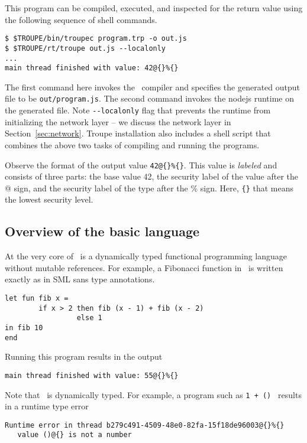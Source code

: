 This program can be compiled, executed, and inspected for the return value using the following sequence of shell commands.
\begin{verbatim}
$ $TROUPE/bin/troupec program.trp -o out.js
$ $TROUPE/rt/troupe out.js --localonly 
...
main thread finished with value: 42@{}%{}
\end{verbatim}

The first command here invokes the \troupelang\ compiler and specifies the generated output file to be {\tt out/program.js}.
The second command invokes the nodejs runtime on the generated file. Note {\tt {-}{-}localonly} flag that 
prevents the runtime from initializing the network layer -- we discuss the network layer in Section~\ref{sec:network}.
Troupe installation also includes a shell script  that combines the above two tasks of compiling 
and running the programs.

Observe the format of the output value {\tt 42@\{\}\%\{\}}. This value is \emph{labeled} and consists of three 
parts: the base value 42, the security label of the value after the @ sign, 
and the security label of the type after the \% sign. Here,  {\tt \{\}} that means the lowest security level.



\subsection{Overview of the basic language}
At the very core of \troupelang\ is a dynamically typed functional programming language without mutable references. 
For example, a Fibonacci function in \troupelang\ is written exactly as in SML sans type annotations. 
\begin{lstlisting}
let fun fib x = 
        if x > 2 then fib (x - 1) + fib (x - 2)
                 else 1
in fib 10
end
\end{lstlisting}
Running this program results in the output
\begin{verbatim}
main thread finished with value: 55@{}%{}
\end{verbatim}


Note that \troupelang\ is dynamically typed. For example, a program such as {\tt 1 + () } results in a 
runtime type error

\begin{verbatim}
Runtime error in thread b279c491-4509-48e0-82fa-15f18de96003@{}%{}
   value ()@{} is not a number    
\end{verbatim}

